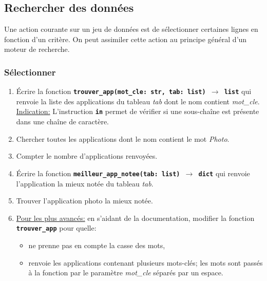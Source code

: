 \documentclass[a4paper,11pt]{article}
\begin{document}
\subsection{Rechercher des données}
Une action courante sur un jeu de données est de sélectionner certaines lignes en fonction d'un critère. On peut assimiler cette action au principe général d'un moteur de recherche.
\subsubsection{Sélectionner}
\begin{activite}
    \begin{enumerate}
        \item Écrire la fonction \textbf{\texttt{trouver\_app(mot\_cle: str, tab: list) $\rightarrow$ list}} qui renvoie la liste des applications du tableau \emph{tab} dont le nom contient \emph{mot\_cle}.\\
              \underline{Indication:} L'instruction \textbf{\texttt{in}} permet de vérifier si une sous-chaîne est présente dans une chaîne de caractère.
        \item Chercher toutes les applications dont le nom contient le mot \emph{Photo}.
        \item Compter le nombre d'applications renvoyées.
        \item Écrire la fonction \textbf{\texttt{meilleur\_app\_notee(tab: list) $\rightarrow$ dict}} qui renvoie l'application la mieux notée du tableau \emph{tab}.
        \item Trouver l'application photo la mieux notée.
        \item \underline{Pour les plus avancés:} en s'aidant de la documentation, modifier la fonction \textbf{\texttt{trouver\_app}} pour quelle:
              \begin{itemize}
                  \item ne prenne pas en compte la casse des mots,
                  \item renvoie les applications contenant plusieurs mots-clés; les mots sont passés à la fonction par le paramètre \emph{mot\_cle} séparés par un espace.
              \end{itemize}
    \end{enumerate}
\end{activite}
\end{document}

